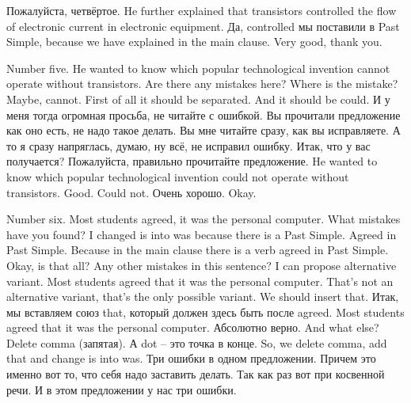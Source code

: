 \documentclass[main.tex]{subfiles}
\begin{document}
Пожалуйста, четвёртое.
He further explained that transistors controlled the flow of electronic current in electronic equipment.
Да, controlled мы поставили в Past Simple, because we have explained in the main clause.
Very good, thank you.

Number five.
He wanted to know which popular technological invention  cannot operate without transistors.
Are there any mistakes here?
Where is the mistake?
Maybe, cannot.
First of all it should be separated.
And it should be could.
И у меня тогда огромная просьба, не читайте с ошибкой.
Вы прочитали предложение как оно есть, не надо такое делать.
Вы мне читайте сразу, как вы исправляете.
А то я сразу напряглась, думаю, ну всё, не исправил ошибку.
Итак, что у вас получается?
Пожалуйста, правильно прочитайте предложение.
He wanted to know which popular technological invention  could not operate without transistors.
Good. Could not. Очень хорошо. Okay.

Number six.
Most students agreed, it was the personal computer.
What mistakes have you found?
I changed is into was because there is a Past Simple.
Agreed in Past Simple.
Because in the main clause there is a verb agreed in Past Simple.
Okay, is that all?
Any other mistakes in this sentence?
I can propose alternative variant.
Most students agreed that it was the personal computer.
That's not an alternative variant, that's the only possible variant.
We should insert that.
Итак, мы вставляем союз that, который должен здесь быть после agreed.
Most students agreed that it was the personal computer.
Абсолютно верно.
And what else?
Delete comma (запятая).
А dot -- это точка в конце.
So, we delete comma, add that and change is into was.
Три ошибки в одном предложении.
Причем это именно вот то, что себя надо заставить делать.
Так как раз вот при косвенной речи.
И в этом предложении у нас три ошибки.
\end{document}
